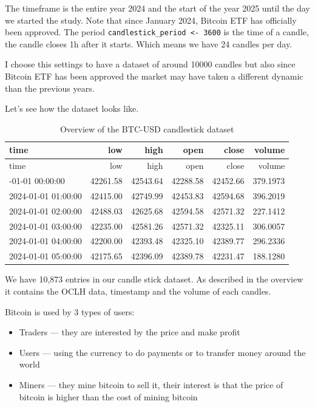 \documentclass[
]{article}
\begin{document}
The timeframe is the entire year 2024 and the start of the year 2025
until the day we started the study. Note that since January 2024,
Bitcoin ETF has officially been approved. The period
\texttt{candlestick\_period\ \textless{}-\ 3600} is the time of a
candle, the candle closes 1h after it starts. Which means we have 24
candles per day.

I choose this settings to have a dataset of around 10000 candles but
also since Bitcoin ETF has been approved the market may have taken a
different dynamic than the previous years.

Let's see how the dataset looks like.

\begin{longtable}[]{@{}lrrrrr@{}}
\caption{Overview of the BTC-USD candlestick dataset}\tabularnewline
\toprule\noalign{}
time & low & high & open & close & volume \\
\midrule\noalign{}
\endfirsthead
\toprule\noalign{}
time & low & high & open & close & volume \\
\midrule\noalign{}
\endhead
\bottomrule\noalign{}
\endlastfoot
2024-01-01 00:00:00 & 42261.58 & 42543.64 & 42288.58 & 42452.66 &
379.1973 \\
2024-01-01 01:00:00 & 42415.00 & 42749.99 & 42453.83 & 42594.68 &
396.2019 \\
2024-01-01 02:00:00 & 42488.03 & 42625.68 & 42594.58 & 42571.32 &
227.1412 \\
2024-01-01 03:00:00 & 42235.00 & 42581.26 & 42571.32 & 42325.11 &
306.0057 \\
2024-01-01 04:00:00 & 42200.00 & 42393.48 & 42325.10 & 42389.77 &
296.2336 \\
2024-01-01 05:00:00 & 42175.65 & 42396.09 & 42389.78 & 42231.47 &
188.1280 \\
\end{longtable}

We have 10,873 entries in our candle stick dataset. As described in the
overview it contains the OCLH data, timestamp and the volume of each
candles.

Bitcoin is used by 3 types of users:

\begin{itemize}
\item
  Traders --- they are interested by the price and make profit
\item
  Users --- using the currency to do payments or to transfer money
  around the world
\item
  Miners --- they mine bitcoin to sell it, their interest is that the
  price of bitcoin is higher than the cost of mining bitcoin
\end{itemize}
\end{document}
